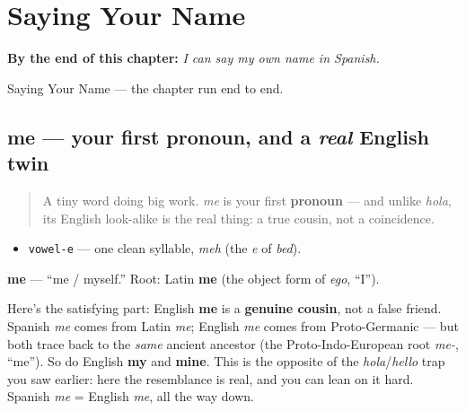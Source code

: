 
\chapter{Saying Your Name}
\label{ch:your-name}

\begin{chapteropening}
\textbf{By the end of this chapter:} \emph{I can say my own name in Spanish.}

Saying Your Name — the chapter run end to end.
\end{chapteropening}

\section[me]{me — your first pronoun, and a \emph{real} English twin}

\label{lesson:ES-C03-me}



\begin{quote}
A tiny word doing big work. \emph{me} is your first \textbf{pronoun} — and unlike \emph{hola}, its English look-alike is the real thing: a true cousin, not a coincidence.
\end{quote}

\begin{sounds}
\begin{itemize}
\raggedright
  \item \texttt{vowel-e} — one clean syllable, \emph{meh} (the \emph{e} of \emph{bed}).
\end{itemize}
\end{sounds}

\begin{cousinweb}
\textbf{me} — \textquotedblleft{}me / myself.\textquotedblright{} Root: Latin \textbf{me} (the object form of \emph{ego}, \textquotedblleft{}I\textquotedblright{}).

Here's the satisfying part: English \textbf{me} is a \textbf{genuine cousin}, not a false friend. Spanish \emph{me} comes from Latin \emph{me}; English \emph{me} comes from Proto-Germanic — but both trace back to the \emph{same} ancient ancestor (the Proto-Indo-European root \emph{me-}, \textquotedblleft{}me\textquotedblright{}). So do English \textbf{my} and \textbf{mine}. This is the opposite of the \emph{hola}/\emph{hello} trap you saw earlier: here the resemblance is real, and you can lean on it hard. Spanish \emph{me} = English \emph{me}, all the way down.
\end{cousinweb}

